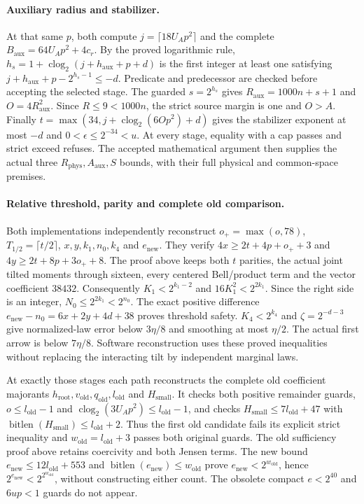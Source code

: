 \paragraph{Auxiliary radius and stabilizer.}
At that same $p$, both compute $j=\lceil18U_Ap^2\rceil$ and the complete
$B_{\mathrm{aux}}=64U_Ap^2+4c_r$. By the proved logarithmic rule,
$h_s=1+\operatorname{clog}_2(j+h_{\mathrm{aux}}+p+d)$ is the first integer
at least one satisfying $j+h_{\mathrm{aux}}+p-2^{h_s-1}\le-d$.
Predicate and predecessor are checked before accepting the selected stage.
The guarded $s=2^{h_s}$ gives $R_{\mathrm{aux}}=1000n+s+1$ and
$O=4R_{\mathrm{aux}}^2$. Since $R\le9<1000n$, the strict source margin is
one and $O>A$. Finally
$t=\max(34,j+\operatorname{clog}_2(6Op^2)+d)$ gives the stabilizer exponent
at most $-d$ and $0<\epsilon\le2^{-34}<u$.
At every stage, equality with a cap passes and strict exceed refuses.
The accepted mathematical argument then supplies the actual three
$R_{\mathrm{phys}},A_{\mathrm{aux}},S$ bounds, with their full physical and
common-space premises.

\paragraph{Relative threshold, parity and complete old comparison.}
Both implementations independently reconstruct $o_+=\max(o,78)$,
$T_{1/2}=\lceil t/2\rceil$, $x,y,k_1,n_0,k_4$ and $e_{\mathrm{new}}$.
They verify $4x\ge2t+4p+o_++3$ and
$4y\ge2t+8p+3o_++8$. The proof above keeps both $t$ parities, the actual
joint tilted moments through sixteen, every centered Bell/product term and
the vector coefficient $38432$. Consequently $K_1<2^{k_1-2}$ and
$16K_1^2<2^{2k_1}$. Since the right side is an integer,
$N_0\le2^{2k_1}<2^{n_0}$. The exact positive difference
$e_{\mathrm{new}}-n_0=6x+2y+4d+38$ proves threshold safety.
$K_4<2^{k_4}$ and $\zeta=2^{-d-3}$ give normalized-law error below
$3\eta/8$ and smoothing at most $\eta/2$. The actual first arrow is below
$7\eta/8$. Software reconstruction uses these proved inequalities without
replacing the interacting tilt by independent marginal laws.

At exactly those stages each path reconstructs the complete old coefficient
majorants $h_{\mathrm{root}},v_{\mathrm{old}},q_{\mathrm{old}},l_{\mathrm{old}}$
and $H_{\mathrm{small}}$. It checks both positive remainder guards,
$o\le l_{\mathrm{old}}-1$ and
$\operatorname{clog}_2(3U_Ap^2)\le l_{\mathrm{old}}-1$, and checks
$H_{\mathrm{small}}\le7l_{\mathrm{old}}+47$ with
$\operatorname{bitlen}(H_{\mathrm{small}})\le l_{\mathrm{old}}+2$.
Thus the first old candidate fails its explicit strict inequality and
$w_{\mathrm{old}}=l_{\mathrm{old}}+3$ passes both original guards.
The old sufficiency proof above retains coercivity and both Jensen terms.
The new bound $e_{\mathrm{new}}\le12l_{\mathrm{old}}+553$ and
$\operatorname{bitlen}(e_{\mathrm{new}})\le w_{\mathrm{old}}$ prove
$e_{\mathrm{new}}<2^{w_{\mathrm{old}}}$, hence
$2^{e_{\mathrm{new}}}<2^{2^{w_{\mathrm{old}}}}$, without constructing either
count. The obsolete compact $e<2^{40}$ and $6up<1$ guards do not appear.

